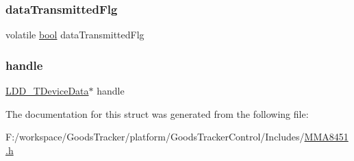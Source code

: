 \subsubsection{\texorpdfstring{data\+Transmitted\+Flg}{dataTransmittedFlg}}
{\footnotesize\ttfamily volatile \hyperlink{group___p_e___types__module_ga97a80ca1602ebf2303258971a2c938e2}{bool} data\+Transmitted\+Flg}

\mbox{\label{struct_m_m_a8451___t_data_state_aaee7757e46c8f9489a453e1a3a7319e8}} 
\subsubsection{\texorpdfstring{handle}{handle}}
{\footnotesize\ttfamily \hyperlink{group___p_e___types__module_gac5cf1362f1f0e3a2ce71b1bf2276d091}{L\+D\+D\+\_\+\+T\+Device\+Data}$\ast$ handle}



The documentation for this struct was generated from the following file\+:\begin{DoxyCompactItemize}
\item 
F\+:/workspace/\+Goods\+Tracker/platform/\+Goods\+Tracker\+Control/\+Includes/\hyperlink{_m_m_a8451_8h}{M\+M\+A8451.\+h}\end{DoxyCompactItemize}
